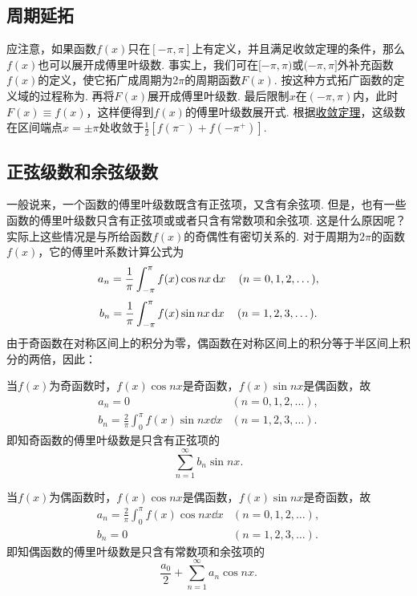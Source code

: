 \subsection{周期延拓}
应注意，如果函数\(f(x)\)只在\([-\pi,\pi]\)上有定义，并且满足收敛定理的条件，那么\(f(x)\)也可以展开成傅里叶级数.
事实上，我们可在\([-\pi,\pi)\)或\((-\pi,\pi]\)外补充函数\(f(x)\)的定义，使它拓广成周期为\(2\pi\)的周期函数\(F(x)\).
按这种方式拓广函数的定义域的过程称为.
再将\(F(x)\)展开成傅里叶级数.
最后限制\(x\)在\((-\pi,\pi)\)内，此时\(F(x) \equiv f(x)\)，这样便得到\(f(x)\)的傅里叶级数展开式.
根据\hyperref[theorem:无穷级数.傅里叶级数收敛的狄利克雷充分条件]{收敛定理}，这级数在区间端点\(x=\pm\pi\)处收敛于\(\frac{1}{2} [f(\pi^-) + f(-\pi^+)]\).

\subsection{正弦级数和余弦级数}
一般说来，一个函数的傅里叶级数既含有正弦项，又含有余弦项.
但是，也有一些函数的傅里叶级数只含有正弦项或或者只含有常数项和余弦项.
这是什么原因呢？实际上这些情况是与所给函数\(f(x)\)的奇偶性有密切关系的.
对于周期为\(2\pi\)的函数\(f(x)\)，它的傅里叶系数计算公式为\[
a_n = \frac{1}{\pi} \int_{-\pi}^{\pi} f(x) \cos nx \dd{x} \quad(n=0,1,2,\dotsc),
\]\[
b_n = \frac{1}{\pi} \int_{-\pi}^{\pi} f(x) \sin nx \dd{x} \quad(n=1,2,3,\dotsc).
\]
由于奇函数在对称区间上的积分为零，偶函数在对称区间上的积分等于半区间上积分的两倍，因此：

当\(f(x)\)为奇函数时，\(f(x) \cos nx\)是奇函数，\(f(x) \sin nx\)是偶函数，故\[
\begin{array}{ll}
a_n = 0 & (n=0,1,2,\dotsc), \\
b_n = \frac{2}{\pi} \int_0^{\pi} f(x) \sin nx \dd{x} & (n=1,2,3,\dotsc).
\end{array}
\]即知奇函数的傅里叶级数是只含有正弦项的\[
\sum\limits_{n=1}^\infty b_n \sin nx.
\]

当\(f(x)\)为偶函数时，\(f(x) \cos nx\)是偶函数，\(f(x) \sin nx\)是奇函数，故\[
\begin{array}{ll}
a_n = \frac{2}{\pi} \int_0^{\pi} f(x) \cos nx \dd{x} & (n=0,1,2,\dotsc), \\
b_n = 0 & (n=1,2,3,\dotsc).
\end{array}
\]即知偶函数的傅里叶级数是只含有常数项和余弦项的\[
\frac{a_0}{2} + \sum\limits_{n=1}^\infty a_n \cos{nx}.
\]

